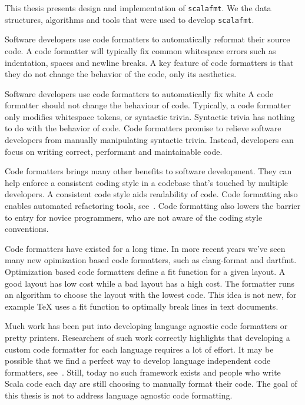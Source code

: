 \documentclass[11pt,a4paper]{article}
\newcommand{\scalafmt}{\texttt{scalafmt}}
\begin{document}
This thesis presents  design and implementation of \scalafmt.
We the data structures, algorithms and tools that were used to develop \scalafmt.


Software developers use code formatters to automatically reformat their source code.
A code formatter will typically fix common whitespace errors such as indentation, spaces and newline breaks.
A key feature of code formatters is that they do not change the behavior of the code, only its aesthetics.










Software developers use code formatters to automatically fix white
A code formatter should not change the behaviour of code.
Typically, a code formatter only modifies whitespace tokens, or syntactic trivia.
Syntactic trivia has nothing to do with the behavior of code.
Code formatters promise to relieve software developers from manually manipulating
syntactic trivia.
Instead, developers can focus on writing correct, performant and maintainable code.

Code formatters brings many other benefits to software development.
They can help enforce a consistent coding style in a codebase that's touched by multiple developers.
A consistent code style aids readability of code.
Code formatting also enables automated refactoring tools, see~\autocite{wright_large-scale_2013}.
Code formatting also lowers the barrier to entry for novice programmers, who are not aware of the coding style conventions.

Code formatters have existed for a long time.
In more recent years we've seen many new opimization based code formatters, such as clang-format and dartfmt.
Optimization based code formatters define a fit function for a given layout.
A good layout has low cost while a bad layout has a high cost.
The formatter runs an algorithm to choose the layout with the lowest code.
This idea is not new, for example TeX uses a fit function to optimally break lines
in text documents.

Much work has been put into developing language agnostic code formatters or pretty printers.
Researchers of such work correctly highlights that developing a custom code formatter for each language requires a lot of effort.
It may be possible that we find a perfect way to develop language independent code formatters, see~\autocite{mps_article}.
Still, today no such framework exists and people who write Scala code each day are still choosing to manually format their code.
The goal of this thesis is not to address language agnostic code formatting.
\end{document}
